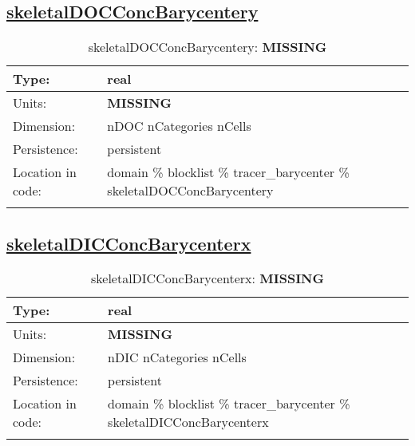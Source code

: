 \subsection[skeletalDOCConcBarycentery]{\hyperref[sec:var_tab_tracer_barycenter]{skeletalDOCConcBarycentery}}
\label{subsec:var_sec_tracer_barycenter_skeletalDOCConcBarycentery}
\begin{center}
\begin{longtable}{| p{2.0in} | p{4.0in} |}
        \hline 
        Type: & real \\
        \hline 
        Units: & {\bf \color{red} MISSING} \\
        \hline 
        Dimension: & nDOC nCategories nCells \\
        \hline 
        Persistence: & persistent \\
        \hline 
         Location in code: & domain \% blocklist \% tracer\_barycenter \% skeletalDOCConcBarycentery \\
         \hline 
    \caption{skeletalDOCConcBarycentery: {\bf \color{red} MISSING}}
\end{longtable}
\end{center}
\subsection[skeletalDICConcBarycenterx]{\hyperref[sec:var_tab_tracer_barycenter]{skeletalDICConcBarycenterx}}
\label{subsec:var_sec_tracer_barycenter_skeletalDICConcBarycenterx}
\begin{center}
\begin{longtable}{| p{2.0in} | p{4.0in} |}
        \hline 
        Type: & real \\
        \hline 
        Units: & {\bf \color{red} MISSING} \\
        \hline 
        Dimension: & nDIC nCategories nCells \\
        \hline 
        Persistence: & persistent \\
        \hline 
         Location in code: & domain \% blocklist \% tracer\_barycenter \% skeletalDICConcBarycenterx \\
         \hline 
    \caption{skeletalDICConcBarycenterx: {\bf \color{red} MISSING}}
\end{longtable}
\end{center}
